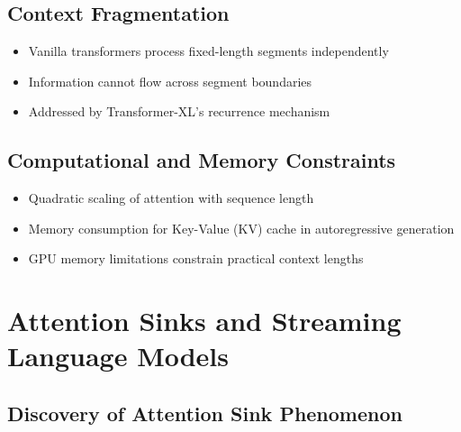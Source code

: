 \documentclass[11pt,letterpaper]{article}
\begin{document}
\subsection{Context Fragmentation}

\begin{itemize}[leftmargin=*]
    \item Vanilla transformers process fixed-length segments independently
    \item Information cannot flow across segment boundaries
    \item Addressed by Transformer-XL's recurrence mechanism
\end{itemize}

\subsection{Computational and Memory Constraints}

\begin{itemize}[leftmargin=*]
    \item Quadratic scaling of attention with sequence length
    \item Memory consumption for Key-Value (KV) cache in autoregressive generation
    \item GPU memory limitations constrain practical context lengths
\end{itemize}

\section{Attention Sinks and Streaming Language Models}

\subsection{Discovery of Attention Sink Phenomenon}
\end{document}
